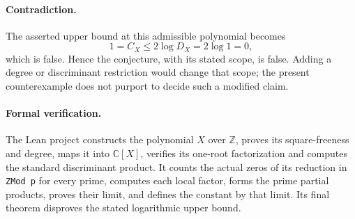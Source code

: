 \documentclass[11pt]{article}
\begin{document}
\paragraph{Contradiction.}
The asserted upper bound at this admissible polynomial becomes
\[
 1=C_X\leq2\log D_X=2\log1=0,
\]
which is false. Hence the conjecture, with its stated scope, is false.
Adding a degree or discriminant restriction would change that scope;
the present counterexample does not purport to decide such a modified
claim.

\paragraph{Formal verification.}
The Lean project constructs the polynomial $X$ over $\mathbb Z$, proves
its square-freeness and degree, maps it into $\mathbb C[X]$, verifies
its one-root factorization and computes the standard discriminant
product. It counts the actual zeros of its reduction in \texttt{ZMod p}
for every prime, computes each local factor, forms the prime partial
products, proves their limit, and defines the constant by that limit.
Its final theorem disproves the stated logarithmic upper bound.
\end{document}
